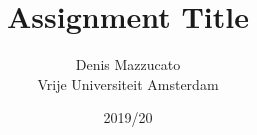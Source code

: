 \documentclass{article}
\begin{document}
\title{Assignment Title}
\author{Denis Mazzucato\\Vrije Universiteit Amsterdam}
\date{2019/20}

\maketitle
\vfill
\tableofcontents
\newpage
\end{document}
